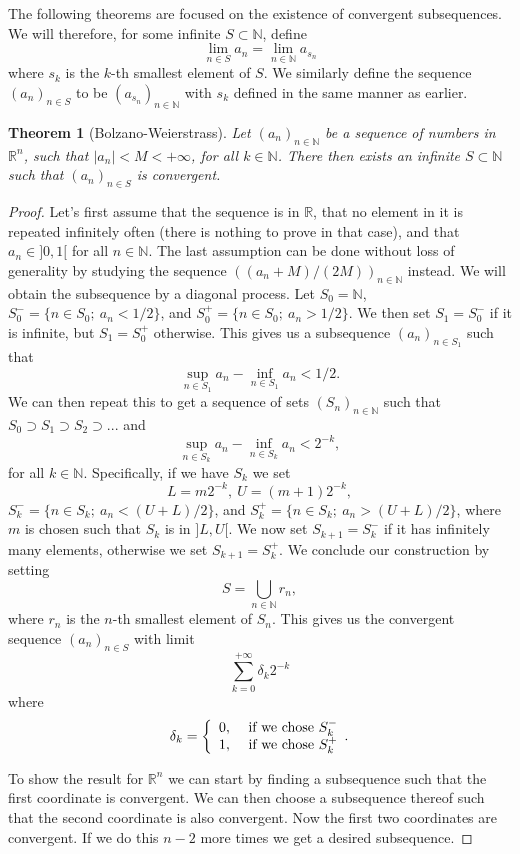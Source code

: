 \documentclass[a4paper,12pt,twoside,BCOR=10mm]{scrbook}
\newtheorem{theorem}{Theorem}[section]
\theoremstyle{definition}
\theoremstyle{definition}
\theoremstyle{definition}
\begin{document}
\label{index19}
The following theorems are focused on the existence of convergent subsequences.
We will therefore, for some infinite $S \subset \mathbb{N}$, define
\[
	\lim_{n \in S} a_n = \lim_{n \in \mathbb{N}} a_{s_n}
\]
where $s_k$ is the $k$-th smallest element of $S$.
We similarly define the sequence $(a_n)_{n \in S}$ to be $(a_{s_n})_{n \in \mathbb{N}}$ with $s_k$ defined in the same manner as earlier.
\begin{theorem}[Bolzano-Weierstrass]
Let $(a_n)_{n \in \mathbb{N}}$ be a sequence of numbers in $\mathbb{R}^n$, such that $|a_n| < M < +\infty$, for all $k \in \mathbb{N}$.
There then exists an infinite $S \subset \mathbb{N}$ such that $(a_n)_{n \in S}$ is convergent.
\end{theorem}
\begin{proof}
Let's first assume that the sequence is in $\mathbb{R}$,
	that no element in it is repeated infinitely often (there is nothing to prove in that case),
	and that $a_n \in ]0, 1[$ for all $n \in \mathbb{N}$.
The last assumption can be done without loss of generality by studying the sequence $((a_n + M)/(2M))_{n \in \mathbb{N}}$ instead.
We will obtain the subsequence by a diagonal process.
Let $S_0 = \mathbb{N}$, $S_0^- = \{n \in S_0;\ a_n < 1/2\}$, and $S_0^+ = \{n \in S_0;\ a_n > 1/2\}$.
We then set $S_1 = S_0^-$ if it is infinite, but $S_1 = S_0^+$ otherwise.
This gives us a subsequence $(a_n)_{n \in S_1}$ such that
\[
	\sup_{n \in S_1} a_n - \inf_{n \in S_1} a_n < 1/2.
\]
We can then repeat this to get a sequence of sets $(S_n)_{n \in \mathbb{N}}$ such that $S_0 \supset S_1 \supset S_2 \supset...$ and 
\[
	\sup_{n \in S_k} a_n - \inf_{n \in S_k} a_n < 2^{-k},
\]
for all $k \in \mathbb{N}$.
Specifically, if we have $S_k$ we set
\[
	L = m2^{-k},\ 
	U = (m + 1)2^{-k},
\]
$S_k^- = \{n \in S_k;\ a_n < (U + L)/2\}$, and $S_k^+ = \{n \in S_k;\ a_n > (U + L)/2\}$, where $m$ is chosen such that $S_k$ is in $]L, U[$.
We now set $S_{k + 1} = S_k^-$ if it has infinitely many elements, otherwise we set $S_{k + 1} = S_k^+$.
We conclude our construction by setting
\[
	S = \bigcup_{n \in \mathbb{N}} r_n,
\]
where $r_n$ is the $n$-th smallest element of $S_n$.
This gives us the convergent sequence $(a_n)_{n \in S}$ with limit
\[
	\sum_{k = 0}^{+\infty} \delta_k 2^{-k}
\]
where
\[
	\delta_k = \left \{
	\begin{array}{c c}
		0,\ & \text{if we chose } S_k^- \\
		1,\ & \text{if we chose } S_k^+
	\end{array}.
	\right .
\]

To show the result for $\mathbb{R}^n$ we can start by finding a subsequence such that the first coordinate is convergent.
We can then choose a subsequence thereof such that the second coordinate is also convergent.
Now the first two coordinates are convergent.
If we do this $n - 2$ more times we get a desired subsequence.
\end{proof}
\end{document}
